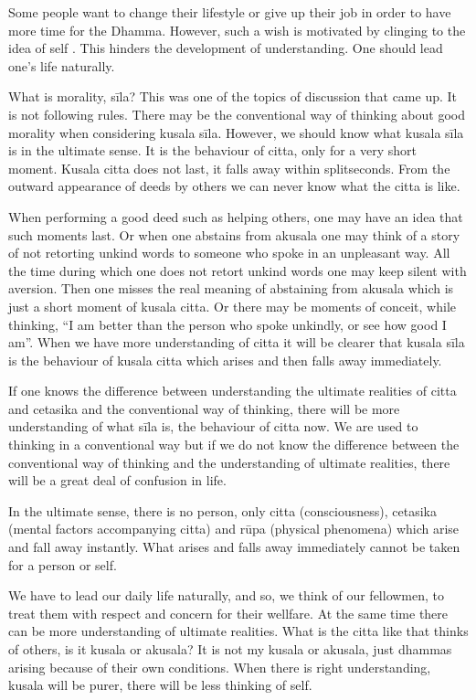 Some people want to change their lifestyle or give up their job in order
to have more time for the Dhamma. However, such a wish is motivated by
clinging to the idea of self . This hinders the development of
understanding. One should lead one's life naturally.

What is morality, sīla? This was one of the topics of discussion that
came up. It is not following rules. There may be the conventional way of
thinking about good morality when considering kusala sīla. However, we
should know what kusala sīla is in the ultimate sense. It is the
behaviour of citta, only for a very short moment. Kusala citta does not
last, it falls away within splitseconds. From the outward appearance of
deeds by others we can never know what the citta is like.

When performing a good deed such as helping others, one may have an idea
that such moments last. Or when one abstains from akusala one may think
of a story of not retorting unkind words to someone who spoke in an
unpleasant way. All the time during which one does not retort unkind
words one may keep silent with aversion. Then one misses the real
meaning of abstaining from akusala which is just a short moment of
kusala citta. Or there may be moments of conceit, while thinking, ``I am
better than the person who spoke unkindly, or see how good I am''. When
we have more understanding of citta it will be clearer that kusala sīla
is the behaviour of kusala citta which arises and then falls away
immediately.

If one knows the difference between understanding the ultimate realities
of citta and cetasika and the conventional way of thinking, there will
be more understanding of what sīla is, the behaviour of citta now. We
are used to thinking in a conventional way but if we do not know the
difference between the conventional way of thinking and the
understanding of ultimate realities, there will be a great deal of
confusion in life.

In the ultimate sense, there is no person, only citta (consciousness),
cetasika (mental factors accompanying citta) and rūpa (physical
phenomena) which arise and fall away instantly. What arises and falls
away immediately cannot be taken for a person or self.

We have to lead our daily life naturally, and so, we think of our
fellowmen, to treat them with respect and concern for their wellfare. At
the same time there can be more understanding of ultimate realities.
What is the citta like that thinks of others, is it kusala or akusala?
It is not my kusala or akusala, just dhammas arising because of their
own conditions. When there is right understanding, kusala will be purer,
there will be less thinking of self.

